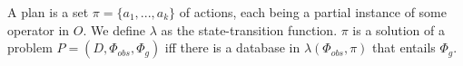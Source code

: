 



\begin{definition}
  \label{def:plan}
  A plan is a set $\pi = \{a_1,...,a_k\}$ of actions, each being a
  partial instance of some operator in $O$.  We define $\lambda$ as
  the state-transition function.  $\pi$ is a solution of a problem $P
  = (D, \Phi_{obs}, \Phi_g)$ iff there is a database in $\lambda(\Phi_{obs},
  \pi)$ that entails $\Phi_g$.
\end{definition}



